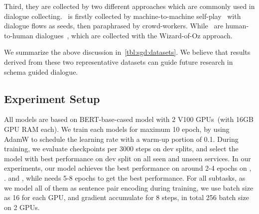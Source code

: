 Third, they are collected by two different approaches which are
commonly used in dialogue collecting. \sgdst~is firstly collected by
machine-to-machine self-play~\cite[M2M,][]{shah2018building} with
dialogue flows as seeds, then paraphrased by crowd-workers. While
\multiwoz~are human-to-human
dialogues~\cite[H2H,][]{kelley1984iterative}, which are collected with
the Wizard-of-Oz approach.

We summarize the above discussion in~\autoref{tbl:sgd:datasets}.  We
believe that results derived from these two representative datasets can
guide future research in schema guided dialogue.


\subsection{Experiment Setup}
\label{ssec:sgd:exp-setup}
All models are based on BERT-base-cased model with 2 V100 GPUs~(with
16GB GPU RAM each). We train each models for maximum 10 epoch, by
using AdamW to schedule the learning rate with a warm-up portion of
0.1. During training, we evaluate checkpoints per 3000 steps on dev
splits, and select the model with best performance on dev split on all
seen and unseen services. In our experiments, our model achieves the
best performance on around 2-4 epochs on \IC, \RSI. and \CSL, while
\NSL needs 5-8 epochs to get the best performance. For all subtasks, as
we model all of them as sentence pair encoding during training, we use
batch size as 16 for each GPU, and gradient accumulate for 8 steps, in
total 256 batch size on 2 GPUs.

